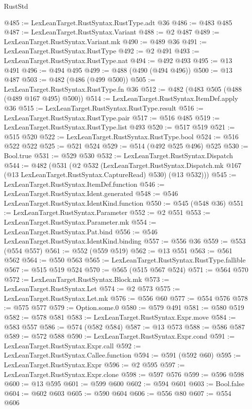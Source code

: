 \begin{lexlean}{RustStd}
\begin{coremodule}
@485 := LexLeanTarget.RustSyntax.RustType.adt @36
@486 := @483 @485
@487 := LexLeanTarget.RustSyntax.Variant
@488 := @2 @487
@489 := LexLeanTarget.RustSyntax.Variant.mk
@490 := @489 @36
@491 := LexLeanTarget.RustSyntax.RustType
@492 := @2 @491
@493 := LexLeanTarget.RustSyntax.RustType.nat
@494 := @492 @493
@495 := @13 @491
@496 := @494 @495
@499 := @488 (@490 (@494 @496))
@500 := @13 @487
@503 := @482 (@486 (@499 @500))
@505 := LexLeanTarget.RustSyntax.RustType.fn @36
@512 := @482 (@483 @505 (@488 (@489 @167 @495) @500))
@514 := LexLeanTarget.RustSyntax.ItemDef.apply @36
@515 := LexLeanTarget.RustSyntax.RustType.result
@516 := LexLeanTarget.RustSyntax.RustType.pair
@517 := @516 @485
@519 := LexLeanTarget.RustSyntax.RustType.list @493
@520 := @517 @519
@521 := @515 @520
@522 := LexLeanTarget.RustSyntax.RustType.bool
@524 := @516 @522 @522
@525 := @521 @524
@529 := @514 (@492 @525 @496) @525
@530 := Bool.true
@531 := @529 @530
@532 := LexLeanTarget.RustSyntax.Dispatch
@544 := @482
    (@531
      (@2
        @532
        (LexLeanTarget.RustSyntax.Dispatch.mk @167 (@13 LexLeanTarget.RustSyntax.CaptureRead) @530)
        (@13 @532)))
@545 := LexLeanTarget.RustSyntax.ItemDef.function
@546 := LexLeanTarget.RustSyntax.Ident.generated
@548 := @546 LexLeanTarget.RustSyntax.IdentKind.function
@550 := @545 (@548 @36)
@551 := LexLeanTarget.RustSyntax.Parameter
@552 := @2 @551
@553 := LexLeanTarget.RustSyntax.Parameter.mk
@554 := LexLeanTarget.RustSyntax.Pat.bind
@556 := @546 LexLeanTarget.RustSyntax.IdentKind.binding
@557 := @556 @36
@559 := @553 (@554 @557)
@561 := @552 (@559 @519)
@562 := @13 @551
@563 := @561 @562
@564 := @550 @563
@565 := LexLeanTarget.RustSyntax.RustType.fallible
@567 := @515 @519 @524
@570 := @565 (@515 @567 @524)
@571 := @564 @570
@572 := LexLeanTarget.RustSyntax.Block.mk
@573 := LexLeanTarget.RustSyntax.Let
@574 := @2 @573
@575 := LexLeanTarget.RustSyntax.Let.mk
@576 := @556 @60
@577 := @554 @576
@578 := @575 @577
@579 := Option.some.{0}
@580 := @579 @491
@581 := @580 @519
@582 := @578 @581
@583 := LexLeanTarget.RustSyntax.Expr.move
@584 := @583 @557
@586 := @574 (@582 @584)
@587 := @13 @573
@588 := @586 @587
@589 := @572 @588
@590 := LexLeanTarget.RustSyntax.Expr.cond
@591 := LexLeanTarget.RustSyntax.Expr.call
@592 := LexLeanTarget.RustSyntax.Callee.function
@594 := @591 (@592 @60)
@595 := LexLeanTarget.RustSyntax.Expr
@596 := @2 @595
@597 := LexLeanTarget.RustSyntax.Expr.clone
@598 := @597 @576
@599 := @596 @598
@600 := @13 @595
@601 := @599 @600
@602 := @594 @601
@603 := Bool.false
@604 := @602 @603
@605 := @590 @604
@606 := @556 @80
@607 := @554 @606

\end{coremodule}
\end{lexlean}
